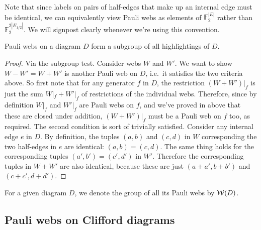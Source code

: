 Note that since labels on pairs of half-edges that make up an internal edge must be identical, we can equivalently view Pauli webs as elements of $\mathbb{F}_2^{|E|}$ rather than $\mathbb{F}_2^{2|E_{1/2}|}$.
We will signpost clearly whenever we're using this convention.

\begin{proposition}\label{prop:pauli_webs_general_form_subgroup}
    Pauli webs on a diagram $D$ form a subgroup of all highlightings of $D$.
    \begin{proof}
        Via the subgroup test.
        Consider webs $W$ and $W'$.
        We want to show $W - W' = W + W'$ is another Pauli web on $D$, i.e.\ it satisfies the two criteria above.
        So first note that for any generator $f$ in $D$, the restriction $(W + W')|_f$ is just the sum $W|_f + W'|_f$ of restrictions of the individual webs.
        Therefore, since by definition $W|_f$ and $W'|_f$ are Pauli webs on $f$, and we've proved in  above that these are closed under addition, $(W + W')|_f$ must be a Pauli web on $f$ too, as required.
        The second condition is sort of trivially satisfied.
        Consider any internal edge $e$ in $D$.
        By definition, the tuples $(a, b)$ and $(c, d)$ in $W$ corresponding the two half-edges in $e$ are identical: $(a, b) = (c, d)$.
        The same thing holds for the corresponding tuples $(a', b') = (c', d')$ in $W'$.
        Therefore the corresponding tuples in $W + W'$ are also identical, because these are just $(a + a', b + b')$ and $(c + c', d + d')$.
    \end{proof}
\end{proposition}

\begin{notation}
    For a given diagram $D$, we denote the group of all its Pauli webs by $\mathcal{W}(D)$.
\end{notation}

\subsection{Pauli webs on Clifford diagrams}\label{subsec:pauli_webs_clifford_diagrams}


